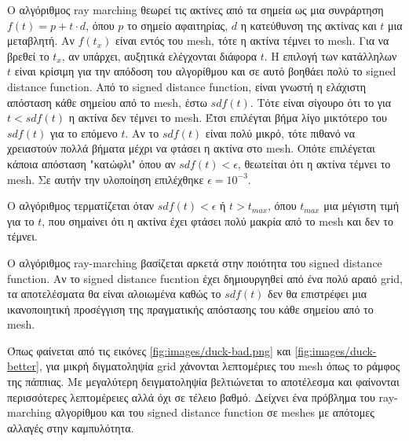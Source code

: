 \documentclass{report}
\begin{document}
Ο αλγόριθμος ray marching θεωρεί τις ακτίνες από τα σημεία ως μια συνράρτηση $f(t) = p + t \cdot d$, όπου $p$ το σημείο
αφαιτηρίας, $d$ η κατεύθυνση της ακτίνας και $t$ μια μεταβλητή. Αν $f(t_x)$ είναι εντός του mesh, τότε η ακτίνα τέμνει το mesh.
Για να βρεθεί το $t_x$, αν υπάρχει, αυξητικά ελέγχονται διάφορα $t$. Η επιλογή των κατάλληλων $t$ είναι κρίσιμη για την
απόδοση του αλγορίθμου και σε αυτό βοηθάει πολύ το signed distance function. Από το signed distance function, είναι 
γνωστή η ελάχιστη απόσταση κάθε σημείου από το mesh, έστω ${sdf}(t)$. Τότε είναι σίγουρο ότι το για $t < {sdf}(t)$ η ακτίνα
δεν τέμνει το mesh. Έτσι επιλέγται βήμα λίγο μικτότερο του ${sdf}(t)$ για το επόμενο $t$. Αν το ${sdf}(t)$ είναι πολύ μικρό,
τότε πιθανό να χρειαστούν πολλά βήματα μέχρι να φτάσει η ακτίνα στο mesh. Οπότε επιλέγεται κάποια απόσταση "κατώφλι" όπου
αν ${sdf}(t) < \epsilon$, θεωτείται ότι η ακτίνα τέμνει το mesh. Σε αυτήν την υλοποίηση επιλέχθηκε $\epsilon = 10^{-3}$.
\cite{ray-marching}


Ο αλγόριθμος τερματίζεται όταν ${sdf}(t) < \epsilon$ ή $t > t_{max}$, όπου $t_{max}$ μια μέγιστη τιμή για το $t$, που σημαίνει
ότι η ακτίνα έχει φτάσει πολύ μακρία από το mesh και δεν το τέμνει.


Ο αλγόριθμος ray-marching βασίζεται αρκετά στην ποιότητα του signed distance function. Αν το signed distance fucntion έχει
δημιουργηθεί από ένα πολύ αραιό grid, τα αποτελέσματα θα είναι αλοιωμένα καθώς το ${sdf}(t)$ δεν θα επιστρέφει μια
ικανοποιητική προσέγγιση της πραγματικής απόστασης του κάθε σημείου από το mesh.

 \label{fig:duck}

Όπως φαίνεται από τις εικόνες \ref{fig:images/duck-bad.png} και \ref{fig:images/duck-better}, για μικρή διγματοληψία grid 
χάνονται λεπτομέριες του mesh όπως το ράμφος της πάππιας. Με μεγαλύτερη δειγματοληψία βελτιώνεται το αποτέλεσμα και 
φαίνονται περισσότερες λεπτομέρειες αλλά όχι σε τέλειο βαθμό. Δείχνει ένα πρόβλημα του ray-marching αλγορίθμου και 
του signed distance function σε meshes με απότομες αλλαγές στην καμπυλότητα.
\end{document}
